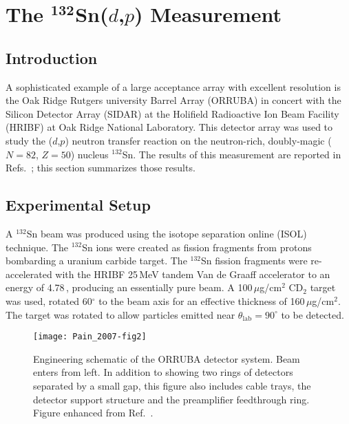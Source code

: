 \section[\texorpdfstring{The $^\text{132}$S\lowercase{n($d$,$p$)} Measurement}{The 132Sn(d,p) Measurement}]{\texorpdfstring{The $^\mathbf{132}$Sn($d$,$p$) Measurement}{The 132Sn(d,p) Measurement}}
\subsection{Introduction}
A sophisticated example of a large acceptance array with excellent resolution is the Oak Ridge Rutgers university Barrel Array (ORRUBA) in concert with the  Silicon Detector Array (SIDAR) at the Holifield Radioactive Ion Beam Facility (HRIBF) at Oak Ridge National Laboratory.  This detector array was used to study the ($d$,$p$) neutron transfer reaction on the neutron-rich, doubly-magic ($N=82$, $Z=50$) nucleus $^{132}$Sn.  The results of this measurement are reported in Refs.~\cite{Jones_2007,Pain_2008,Jones_2010}; this section summarizes those results.

\subsection{Experimental Setup}
A $^{132}$Sn beam was produced using the isotope separation online (ISOL) technique.  The $^{132}$Sn ions were created as fission fragments from protons bombarding a uranium carbide target.  The $^{132}$Sn fission fragments were re-accelerated with the HRIBF 25\,MeV tandem Van de Graaff accelerator to an energy of 4.78\,\AMeV, producing an essentially pure beam.  %
A 100\,$\mu$g/cm$^2$ CD$_2$ target was used, rotated 60$^\circ$ to the beam axis for an effective thickness of 160\,$\mu$g/cm$^2$.  The target was rotated to allow particles emitted near $\theta_\mathrm{lab}=90^\circ$ to be detected.

\begin{figure}%
\centering
\texttt{[image: Pain\_2007-fig2]}%
\caption[Engineering schematic of the ORRUBA detector system]{Engineering schematic of the ORRUBA detector system.  Beam enters from left.  In addition to showing two rings of detectors separated by a small gap, this figure also includes cable trays, the detector support structure and the preamplifier feedthrough ring.  Figure enhanced from Ref.~\cite{Pain_2007}.}%
\label{orruba}%
\end{figure}

